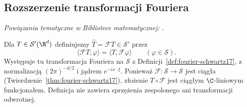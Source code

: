 \subsection{Rozszerzenie transformacji Fouriera}

\noindent\emph{Powiązania tematyczne w Bibliotece matematycznej:} .


\begin{definicja}
\label{def:fourier-tempered22}
Dla $T\in\mathcal S'(\R^d)$ definiujemy
$\widehat T=\mathcal F T\in\mathcal S'$ przez
\[
\langle\mathcal F T,\varphi\rangle
=\langle T,\mathcal F\varphi\rangle
\qquad(\varphi\in\mathcal S).
\]
Występuje tu transformacja Fouriera na $\mathcal S$
z Definicji~\ref{def:fourier-schwartz17}, z normalizacją
$(2\pi)^{-d/2}$ i jądrem $e^{-ix\cdot\xi}$.
Ponieważ $\mathcal F:\mathcal S\to\mathcal S$ jest ciągła
(Twierdzenie~\ref{thm:fourier-schwartz17}), złożenie
$T\circ\mathcal F$ jest ciągłym $\C$-liniowym funkcjonałem.
Definicja nie zawiera sprzężenia zespolonego ani
transformacji odwrotnej.
\end{definicja}

